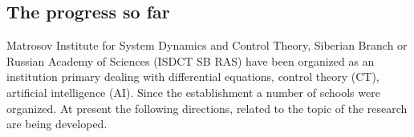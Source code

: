 \documentclass[runningheads]{llncs}
\begin{document}




\subsection{The progress so far}
\label{sec:progress}


Matrosov Institute for System Dynamics and Control Theory, Siberian Branch or Russian Academy of Sciences (ISDCT SB RAS) have been organized as an institution primary dealing with differential equations, control theory (CT), artificial intelligence (AI). Since the establishment a number of schools were organized. At present the following directions, related to the topic of the research are being developed.
\end{document}
